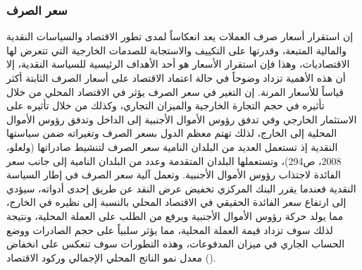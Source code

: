 \documentclass[10pt,a4paper]{report}
\begin{document}
\begin{doublespacing}
\subsubsection{سعر الصرف}
إن استقرار أسعار صرف العملات يعد انعكاساً لمدى تطور الاقتصاد والسياسات النقدية والمالية المتبعة، وقدرتها على التكييف والاستجابة للصدمات الخارجية التي تتعرض لها الاقتصاديات، وهذا فإن استقرار الأسعار هو أحد الأهداف الرئيسية للسياسة النقدية، إلا أن هذه الأهمية تزداد وضوحاً في حالة اعتماد الاقتصاد على أسعار الصرف الثابتة أكثر قياساً للأسعار المرنة. إن التغير في سعر الصرف يؤثر في الاقتصاد المحلي من خلال تأثيره في حجم التجارة الخارجية والميزان التجاري، وكذلك من خلال تأثيره على الاستثمار الخارجي وفي تدفق رؤوس الأموال الأجنبية إلى الداخل وتدفق رؤوس الأموال المحلية إلى الخارج، لذلك تهتم معظم الدول بسعر الصرف وتغيراته ضمن سياستها النقدية إذ تستعمل العديد من البلدان النامية سعر الصرف لتنشيط صادراتها ({ولعلو، 2008، ص294})، وتستعملها البلدان المتقدمة وعدد من البلدان النامية إلى جانب سعر الفائدة لاجتذاب رؤوس الأموال الأجنبية. وتعمل آلية سعر الصرف في إطار السياسة النقدية فعندما يقرر البنك المركزي تخفيض عرض النقد عن طريق إحدى أدواته، سيؤدي إلى ارتفاع سعر الفائدة الحقيقي في الاقتصاد المحلي بالنسبة إلى نظيره في الخارج، مما يولد حركة رؤوس الأموال الأجنبية ويرفع من الطلب على العملة المحلية، ونتيجة لذلك سوف تزداد قيمة العملة المحلية، مما يؤثر سلبياً على حجم الصادرات ووضع الحساب الجاري في ميزان المدفوعات، وهذه التطورات سوف تنعكس على انخفاض معدل نمو الناتج المحلي الإجمالي وركود الاقتصاد ().

\end{doublespacing}
\end{document}
